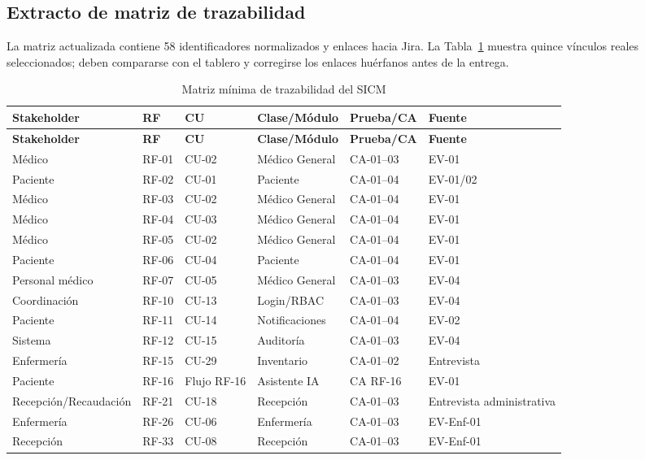 \documentclass[11pt,a4paper]{article}
\begin{document}
	\subsection{Extracto de matriz de trazabilidad}
	La matriz actualizada contiene 58 identificadores normalizados y enlaces hacia Jira. La Tabla~\ref{tab:matriz15} muestra quince vínculos reales seleccionados; deben compararse con el tablero y corregirse los enlaces huérfanos antes de la entrega.
	
	\begin{longtable}{p{2.4cm}p{1.4cm}p{1.5cm}p{3.0cm}p{2.2cm}p{2.0cm}}
		\caption{Matriz mínima de trazabilidad del SICM}\label{tab:matriz15}\\
		\toprule
		\textbf{Stakeholder} & \textbf{RF} & \textbf{CU} & \textbf{Clase/Módulo} & \textbf{Prueba/CA} & \textbf{Fuente}\\
		\midrule\endfirsthead
		\toprule
		\textbf{Stakeholder} & \textbf{RF} & \textbf{CU} & \textbf{Clase/Módulo} & \textbf{Prueba/CA} & \textbf{Fuente}\\
		\midrule\endhead
		Médico & RF-01 & CU-02 & Médico General & CA-01--03 & EV-01\\
		Paciente & RF-02 & CU-01 & Paciente & CA-01--04 & EV-01/02\\
		Médico & RF-03 & CU-02 & Médico General & CA-01--04 & EV-01\\
		Médico & RF-04 & CU-03 & Médico General & CA-01--04 & EV-01\\
		Médico & RF-05 & CU-02 & Médico General & CA-01--04 & EV-01\\
		Paciente & RF-06 & CU-04 & Paciente & CA-01--04 & EV-01\\
		Personal médico & RF-07 & CU-05 & Médico General & CA-01--03 & EV-04\\
		Coordinación & RF-10 & CU-13 & Login/RBAC & CA-01--03 & EV-04\\
		Paciente & RF-11 & CU-14 & Notificaciones & CA-01--04 & EV-02\\
		Sistema & RF-12 & CU-15 & Auditoría & CA-01--03 & EV-04\\
		Enfermería & RF-15 & CU-29 & Inventario & CA-01--02 & Entrevista\\
		Paciente & RF-16 & Flujo RF-16 & Asistente IA & CA RF-16 & EV-01\\
		Recepción/Recaudación & RF-21 & CU-18 & Recepción & CA-01--03 & Entrevista administrativa\\
		Enfermería & RF-26 & CU-06 & Enfermería & CA-01--03 & EV-Enf-01\\
		Recepción & RF-33 & CU-08 & Recepción & CA-01--03 & EV-Enf-01\\
		\bottomrule
	\end{longtable}
	
\end{document}
